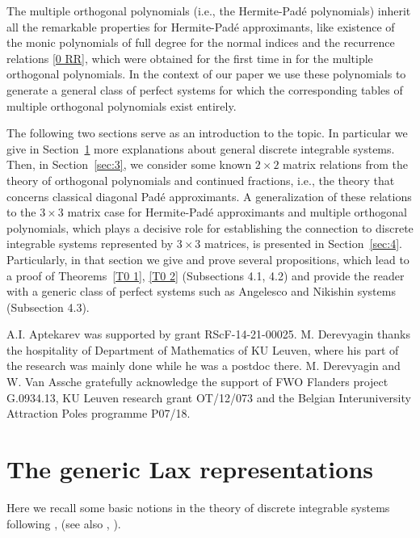 \documentclass{amsart}
\theoremstyle{remark}
\numberwithin{equation}{section}
\begin{document}
The multiple orthogonal polynomials (i.e., the  {Her\-mite-Pad\'e}{} polynomials) inherit all the remarkable properties for Hermite-Pad\'e approximants, like existence  of the monic polynomials of full degree for the normal indices and the recurrence relations \eqref{0 RR}, which were obtained for the first time in 
\cite{vanA2011} for the multiple orthogonal polynomials. In the context of our paper we use these polynomials to generate a general class of perfect systems for which the corresponding tables of multiple orthogonal polynomials exist entirely.

\bigskip

 The following two sections serve as an introduction to the topic. In particular we give in Section~\ref{sec:2}  more explanations about general discrete integrable systems. Then, in Section~\ref{sec:3}, we consider some known $2 \times 2$ matrix relations from the theory of orthogonal polynomials and continued fractions, i.e.,
the theory that concerns classical diagonal Pad\'e approximants. A generalization of these relations to the $3 \times 3$ matrix case for {Her\-mite-Pad\'e}{} approximants and multiple orthogonal polynomials, which plays a decisive role for establishing the connection to discrete integrable systems represented by $3 \times 3$ matrices, is presented in Section~\ref{sec:4}. Particularly, in that section we give and prove several propositions, which lead to a proof of Theorems~\ref{T0 1}, \ref{T0 2} (Subsections 4.1, 4.2) and provide the reader with a generic class of perfect systems such as Angelesco and Nikishin systems (Subsection 4.3).

\bigskip

 A.I. Aptekarev was supported by grant RScF-14-21-00025. M. Derevyagin thanks the hospitality of Department of Mathematics of KU Leuven, where his part of the research was mainly done while he was a postdoc there. M. Derevyagin and W. Van Assche gratefully acknowledge the support of FWO Flanders project G.0934.13, KU Leuven research grant OT/12/073 and the Belgian Interuniversity Attraction Poles 
programme P07/18.

\section{The generic Lax representations}\label{sec:2}

Here we recall some basic notions in the theory of discrete integrable systems following \cite{Adler2001}, \cite{BS2002}
(see also \cite{PGR1995}, \cite{SNderK2011}).
\end{document}
